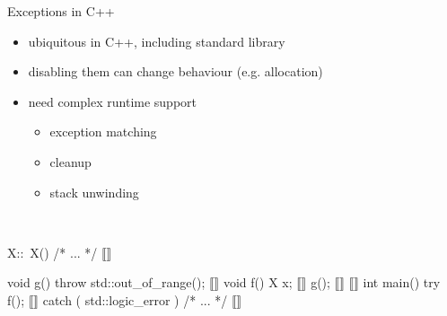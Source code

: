 \documentclass[aspectratio=169, fi]{paradise-slide}
\begin{document}
\newcommand{\arr}[1]{\visible<#1>{\textcolor{red}{$\mathbf{\longleftarrow}$}}}
\begin{frame}[fragile]{Exceptions in C++}
  \begin{minipage}{0.47\textwidth}
    \setlength{\leftmargini}{1em}
    \begin{itemize}
      \item ubiquitous in C++, including standard library
      \item disabling them can change behaviour (e.g. allocation)
      \item need complex runtime support
        \begin{itemize}
          \item exception matching
          \item cleanup
          \item stack unwinding
        \end{itemize}
    \end{itemize}

    \bigskip
    \medskip\\
  \end{minipage}
  \hfill
  \pause
  \begin{minipage}{0.47\textwidth}
    \begin{cppcodeln}
      X::~X() { /* ... */ } ⟦\arr{7}⟧

      void g() {
        throw std::out_of_range(); ⟦\arr{5}⟧
      }
      void f() {
        X x; ⟦\arr{3}⟧
        g(); ⟦\arr{4}⟧
      } ⟦\arr{6}⟧
      int main() {
        try {
          f(); ⟦\arr{2}⟧
        } catch ( std::logic_error ) {
          /* ... */ ⟦\arr{8}⟧
        }
      }
    \end{cppcodeln}
  \end{minipage}
\end{frame}
\end{document}
